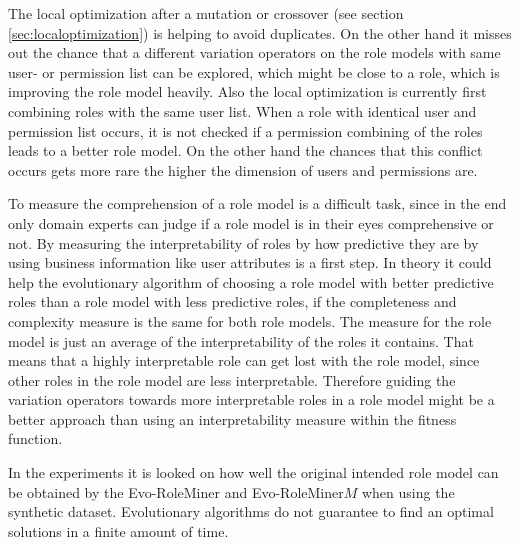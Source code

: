 The local optimization after a mutation or crossover (see section \ref{sec:localoptimization}) is helping to avoid duplicates. On the other hand it misses out the chance that a different variation operators on the role models with same user- or permission list can be explored, which might be close to a role, which is improving the role model heavily. Also the local optimization is currently first combining roles with the same user list. When a role with identical user and permission list occurs, it is not checked if a permission combining of the roles leads to a better role model. On the other hand the chances that this conflict occurs gets more rare the higher the dimension of users and permissions are.

To measure the comprehension of a role model is a difficult task, since in the end only domain experts can judge if a role model is in their eyes comprehensive or not. By measuring the interpretability of roles by how predictive they are by using business information like user attributes is a first step. In theory it could help the evolutionary algorithm of choosing a role model with better predictive roles than a role model with less predictive roles, if the completeness and complexity measure is the same for both role models. The measure for the role model is just an average of the interpretability of the roles it contains. That means that a highly interpretable role can get lost with the role model, since other roles in the role model are less interpretable. Therefore guiding the variation operators towards more interpretable roles in a role model might be a better approach than using an interpretability measure within the fitness function.

In the experiments it is looked on how well the original intended role model can be obtained by the Evo-RoleMiner and Evo-RoleMiner$M$ when using the synthetic dataset. Evolutionary algorithms do not guarantee to find an optimal solutions in a finite amount of time.

